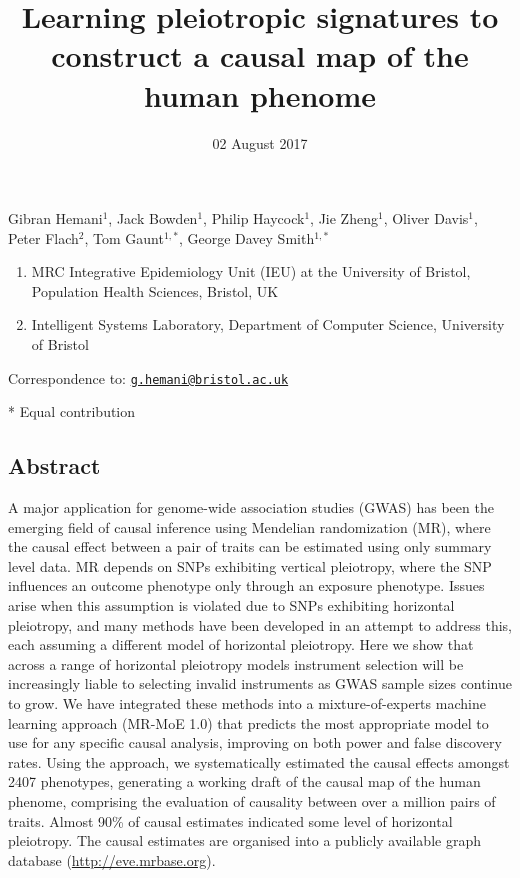 \documentclass[]{article}
\title{Learning pleiotropic signatures to construct a causal map of the human
phenome}
\author{}
\date{02 August 2017}
\providecommand{\tightlist}{%
  \setlength{\itemsep}{0pt}\setlength{\parskip}{0pt}}
\begin{document}
\maketitle

Gibran Hemani\(^1\), Jack Bowden\(^1\), Philip Haycock\(^1\), Jie
Zheng\(^1\), Oliver Davis\(^1\), Peter Flach\(^2\), Tom Gaunt\(^{1,*}\),
George Davey Smith\(^{1,*}\)

\begin{enumerate}
\def\labelenumi{\arabic{enumi}.}
\tightlist
\item
  MRC Integrative Epidemiology Unit (IEU) at the University of Bristol,
  Population Health Sciences, Bristol, UK
\item
  Intelligent Systems Laboratory, Department of Computer Science,
  University of Bristol
\end{enumerate}

Correspondence to:
\href{mailto:g.hemani@bristol.ac.uk}{\nolinkurl{g.hemani@bristol.ac.uk}}

* Equal contribution

\subsection{Abstract}\label{abstract}

A major application for genome-wide association studies (GWAS) has been
the emerging field of causal inference using Mendelian randomization
(MR), where the causal effect between a pair of traits can be estimated
using only summary level data. MR depends on SNPs exhibiting vertical
pleiotropy, where the SNP influences an outcome phenotype only through
an exposure phenotype. Issues arise when this assumption is violated due
to SNPs exhibiting horizontal pleiotropy, and many methods have been
developed in an attempt to address this, each assuming a different model
of horizontal pleiotropy. Here we show that across a range of horizontal
pleiotropy models instrument selection will be increasingly liable to
selecting invalid instruments as GWAS sample sizes continue to grow. We
have integrated these methods into a mixture-of-experts machine learning
approach (MR-MoE 1.0) that predicts the most appropriate model to use
for any specific causal analysis, improving on both power and false
discovery rates. Using the approach, we systematically estimated the
causal effects amongst 2407 phenotypes, generating a working draft of
the causal map of the human phenome, comprising the evaluation of
causality between over a million pairs of traits. Almost 90\% of causal
estimates indicated some level of horizontal pleiotropy. The causal
estimates are organised into a publicly available graph database
(\url{http://eve.mrbase.org}).
\end{document}
